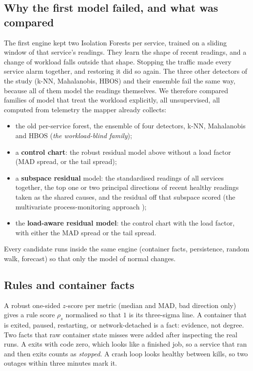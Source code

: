 \subsection{Why the first model failed, and what was compared}
\label{sec:candidates}
The first engine kept two Isolation Forests per service, trained on a sliding window of that service's readings. They learn the shape of recent readings, and a change of workload falls outside that shape. Stopping the traffic made every service alarm together, and restoring it did so again. The three other detectors of the study (k-NN, Mahalanobis, HBOS) and their ensemble fail the same way, because all of them model the readings themselves. We therefore compared families of model that treat the workload explicitly, all unsupervised, all computed from telemetry the mapper already collects:
\begin{itemize}
\item the old per-service forest, the ensemble of four detectors, k-NN, Mahalanobis and HBOS (\emph{the workload-blind family});
\item a \textbf{control chart}: the robust residual model above without a load factor (MAD spread, or the tail spread);
\item a \textbf{subspace residual} model: the standardised readings of all services together, the top one or two principal directions of recent healthy readings taken as the shared causes, and the residual off that subspace scored (the multivariate process-monitoring approach \cite{lakhina2004diagnosing,jackson1979control});
\item the \textbf{load-aware residual model}: the control chart with the load factor, with either the MAD spread or the tail spread.
\end{itemize}
Every candidate runs inside the same engine (container facts, persistence, random walk, forecast) so that only the model of normal changes.

\subsection{Rules and container facts}
A robust one-sided $z$-score per metric (median and MAD, bad direction only) gives a rule score $\rho_s$ normalised so that $1$ is its three-sigma line. A container that is exited, paused, restarting, or network-detached is a fact: evidence, not degree. Two facts that raw container state misses were added after inspecting the real runs. A  exits with code zero, which looks like a finished job, so a service that ran and then exits counts as \emph{stopped}. A crash loop looks healthy between kills, so two outages within three minutes mark it.

